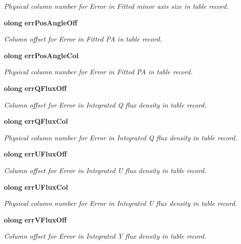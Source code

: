 \begin{CompactItemize}
\begin{CompactList}\small\item\em Physical column number for Error in Fitted minor axis size in table record. \item\end{CompactList}\item 
{\bf olong} {\bf err\-Pos\-Angle\-Off}
\begin{CompactList}\small\item\em Column offset for Error in Fitted PA in table record. \item\end{CompactList}\item 
{\bf olong} {\bf err\-Pos\-Angle\-Col}
\begin{CompactList}\small\item\em Physical column number for Error in Fitted PA in table record. \item\end{CompactList}\item 
{\bf olong} {\bf err\-QFlux\-Off}
\begin{CompactList}\small\item\em Column offset for Error in Integrated Q flux density in table record. \item\end{CompactList}\item 
{\bf olong} {\bf err\-QFlux\-Col}
\begin{CompactList}\small\item\em Physical column number for Error in Integrated Q flux density in table record. \item\end{CompactList}\item 
{\bf olong} {\bf err\-UFlux\-Off}
\begin{CompactList}\small\item\em Column offset for Error in Integrated U flux density in table record. \item\end{CompactList}\item 
{\bf olong} {\bf err\-UFlux\-Col}
\begin{CompactList}\small\item\em Physical column number for Error in Integrated U flux density in table record. \item\end{CompactList}\item 
{\bf olong} {\bf err\-VFlux\-Off}
\begin{CompactList}\small\item\em Column offset for Error in Integrated Y flux density in table record. \item\end{CompactList}\item 

\end{CompactItemize}
